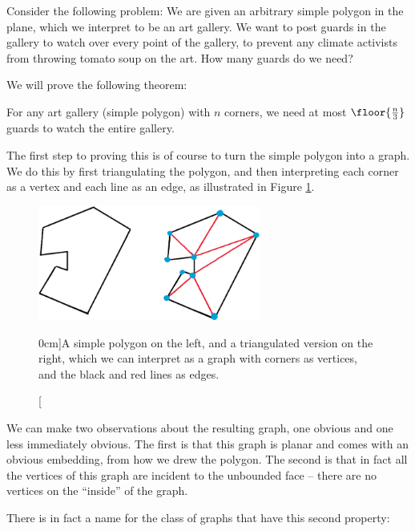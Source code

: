 \documentclass[nobib]{tufte-handout}
\begin{document}
Consider the following problem: We are given an arbitrary simple polygon in the plane, which we interpret to be an art gallery. We want to post guards in the gallery to watch over every point of the gallery, to prevent any climate activists from throwing tomato soup on the art. How many guards do we need?

We will prove the following theorem:

\begin{theorem}
  For any art gallery (simple polygon) with $n$ corners, we need at most $\floor{\frac{n}{3}}$ guards to watch the entire gallery.
\end{theorem}

The first step to proving this is of course to turn the simple polygon into a graph. We do this by first triangulating the polygon, and then interpreting each corner as a vertex and each line as an edge, as illustrated in Figure \ref{fig:triangulated_polygon}.

\begin{figure}
  \centering
  \includegraphics[width=0.65\textwidth]{graphics/L12_colouring/triangulated_polygon.png}
  \caption[][0cm]{A simple polygon on the left, and a triangulated version on the right, which we can interpret as a graph with corners as vertices, and the black and red lines as edges.}
  \label{fig:triangulated_polygon}
\end{figure}

We can make two observations about the resulting graph, one obvious and one less immediately obvious. The first is that this graph is planar and comes with an obvious embedding, from how we drew the polygon. The second is that in fact all the vertices of this graph are incident to the unbounded face -- there are no vertices on the ``inside'' of the graph.

There is in fact a name for the class of graphs that have this second property:
\end{document}
